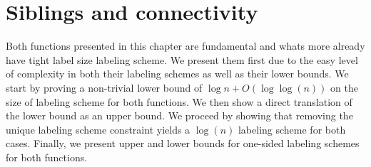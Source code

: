 \newpage
\section{Siblings and connectivity} \label{section:Sib}
Both functions presented in this chapter are fundamental and whats more already have tight label size labeling scheme. We present them first due to the easy level of complexity in both  their labeling schemes as well as their lower bounds.
We start by proving a non-trivial lower bound of $\log n + O(\log \log (n))$ on the size of labeling scheme for both functions.
We then show a direct translation of the lower bound as an upper bound.
We proceed by showing  that removing  the unique labeling scheme constraint yields a $\log(n)$ labeling scheme for both cases.
Finally, we present upper and lower bounds for one-sided labeling schemes for both functions.

